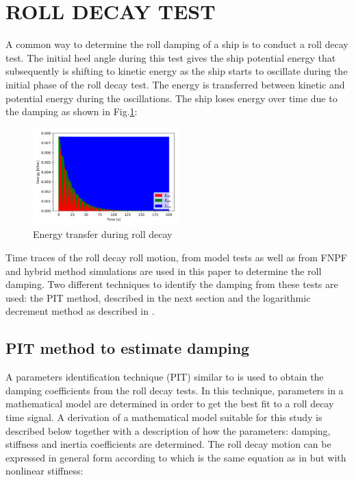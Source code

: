 \section*{ROLL DECAY TEST}\label{roll-decay-test}

    A common way to determine the roll damping of a ship is to conduct a
roll decay test. The initial heel angle during this test gives the ship
potential energy that subsequently is shifting to kinetic energy as the
ship starts to oscillate during the initial phase of the roll decay
test. The energy is transferred between kinetic and potential energy
during the oscillations. The ship loses energy over time due to the
damping as shown in Fig.\ref{fig:energy}:

    
 
            
    
    \begin{figure}[H]
        \begin{center}\includegraphics[width = 0.5\textwidth]{figures/energy.png}\end{center}
        \vspace{-1cm}
        \caption{Energy transfer during roll decay}
        \label{fig:energy}
    \end{figure}
    

    Time traces of the roll decay roll motion, from model tests as well as
from FNPF and hybrid method simulations are used in this paper to
determine the roll damping. Two different techniques to identify the
damping from these tests are used: the PIT method, described in the next
section and the logarithmic decrement method as described in
\citep{7505983/BYNJ8CFG}.
    \subsection*{PIT method to estimate
damping}\label{pit-method-to-estimate-damping}

 \label{se:pit}

    A parameters identification technique (PIT) similar to
\citep{7505983/EXYJELCU} is used to obtain the damping coefficients from
the roll decay tests. In this technique, parameters in a mathematical
model are determined in order to get the best fit to a roll decay time
signal. A derivation of a mathematical model suitable for this study is
described below together with a description of how the parameters:
damping, stiffness and inertia coefficients are determined. The roll
decay motion can be expressed in general form according to
\citep{7505983/KL7A3RIV} which is the same equation as in
\citep{7505983/FB64RGPF} but with nonlinear stiffness:
 
